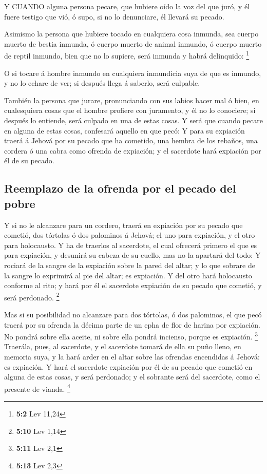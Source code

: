  Y CUANDO alguna persona pecare, que hubiere oído la voz del
que juró, y él fuere testigo que vió, ó supo, si no lo denunciare, él
llevará su pecado.

 Asimismo la persona que hubiere tocado en cualquiera cosa
inmunda, sea cuerpo muerto de bestia inmunda, ó cuerpo muerto de animal
inmundo, ó cuerpo muerto de reptil inmundo, bien que no lo supiere, será
inmunda y habrá delinquido: \footnote{\textbf{5:2} Lev 11,24}

 O si tocare á hombre inmundo en cualquiera inmundicia suya
de que es inmundo, y no lo echare de ver; si después llega á saberlo,
será culpable.

 También la persona que jurare, pronunciando con sus labios
hacer mal ó bien, en cualesquiera cosas que el hombre profiere con
juramento, y él no lo conociere; si después lo entiende, será culpado en
una de estas cosas.  Y será que cuando pecare en alguna de
estas cosas, confesará aquello en que pecó:  Y para su
expiación traerá á Jehová por su pecado que ha cometido, una hembra de
los rebaños, una cordera ó una cabra como ofrenda de expiación; y el
sacerdote hará expiación por él de su pecado.

\hypertarget{reemplazo-de-la-ofrenda-por-el-pecado-del-pobre}{%
\subsection{Reemplazo de la ofrenda por el pecado del
pobre}\label{reemplazo-de-la-ofrenda-por-el-pecado-del-pobre}}

 Y si no le alcanzare para un cordero, traerá en expiación
por su pecado que cometió, dos tórtolas ó dos palominos á Jehová; el uno
para expiación, y el otro para holocausto.  Y ha de traerlos
al sacerdote, el cual ofrecerá primero el que es para expiación, y
desunirá su cabeza de su cuello, mas no la apartará del todo:
 Y rociará de la sangre de la expiación sobre la pared del
altar; y lo que sobrare de la sangre lo exprimirá al pie del altar; es
expiación.  Y del otro hará holocausto conforme al rito; y
hará por él el sacerdote expiación de su pecado que cometió, y será
perdonado. \footnote{\textbf{5:10} Lev 1,14}

 Mas si su posibilidad no alcanzare para dos tórtolas, ó
dos palominos, el que pecó traerá por su ofrenda la décima parte de un
epha de flor de harina por expiación. No pondrá sobre ella aceite, ni
sobre ella pondrá incienso, porque es expiación. \footnote{\textbf{5:11}
  Lev 2,1}  Traerála, pues, al sacerdote, y el sacerdote
tomará de ella su puño lleno, en memoria suya, y la hará arder en el
altar sobre las ofrendas encendidas á Jehová: es expiación.
 Y hará el sacerdote expiación por él de su pecado que
cometió en alguna de estas cosas, y será perdonado; y el sobrante será
del sacerdote, como el presente de vianda. \footnote{\textbf{5:13} Lev
  2,3}

